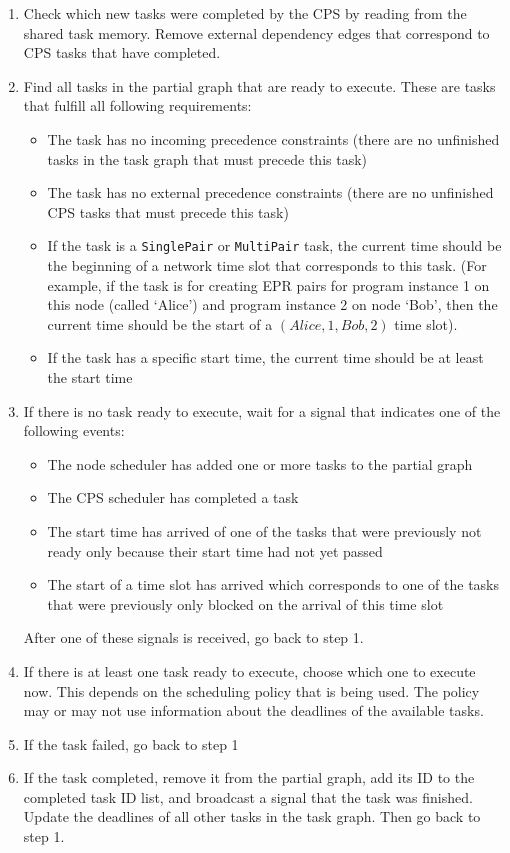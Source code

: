 \begin{enumerate}
    \item Check which new tasks were completed by the CPS by reading from the shared task memory. Remove external dependency edges that correspond to CPS tasks that have completed.
    \item Find all tasks in the partial graph that are ready to execute. These are tasks that fulfill all following requirements:
        \begin{itemize}
            \item The task has no incoming precedence constraints (there are no unfinished tasks in the task graph that must precede this task)
            \item The task has no external precedence constraints (there are no unfinished CPS tasks that must precede this task)
            \item If the task is a \texttt{SinglePair} or \texttt{MultiPair} task, the current time should be the beginning of a network time slot that corresponds to this task. (For example, if the task is for creating EPR pairs for program instance 1 on this node (called `Alice') and program instance 2 on node `Bob', then the current time should be the start of a $(Alice, 1, Bob, 2)$ time slot).
            \item If the task has a specific start time, the current time should be at least the start time
        \end{itemize}
    \item If there is no task ready to execute, wait for a signal that indicates one of the following events:
        \begin{itemize}
            \item The node scheduler has added one or more tasks to the partial graph
            \item The CPS scheduler has completed a task
            \item The start time has arrived of one of the tasks that were previously not ready only because their start time had not yet passed
            \item The start of a time slot has arrived which corresponds to one of the tasks that were previously only blocked on the arrival of this time slot
        \end{itemize}
        After one of these signals is received, go back to step 1.
    \item If there is at least one task ready to execute, choose which one to execute now. This depends on the scheduling policy that is being used. The policy may or may not use information about the deadlines of the available tasks.
    \item If the task failed, go back to step 1
    \item If the task completed, remove it from the partial graph, add its ID to the completed task ID list, and broadcast a signal that the task was finished.
    Update the deadlines of all other tasks in the task graph.
    Then go back to step 1.
\end{enumerate}


